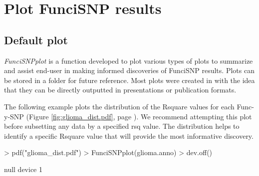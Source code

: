 \documentclass[12pt,fullpage]{article}
\newcommand{\Rmethod}[1]{{\textit{#1}}}
\begin{document}
\section{Plot FunciSNP results}
\subsection{Default plot}

\Rmethod{FunciSNPplot} is a function developed to plot various types of plots to
summarize and assist end-user in making informed discoveries of FunciSNP
results. Plots can be stored in a folder for future reference. Most plots were
created in with the idea that they can be directly outputted in presentations or
publication formats.

The following example plots the distribution of the Rsquare values for each
Func-y-SNP (Figure \ref{fig:glioma_dist.pdf}, page
        \pageref{fig:glioma_dist.pdf}). We recommend attempting this plot before
subsetting any data by a specified rsq value. The distribution helps to identify
a specific Rsquare value that will provide the most informative discovery.

\begin{Schunk}
\begin{Sinput}
> pdf("glioma_dist.pdf")
> FunciSNPplot(glioma.anno)
> dev.off()
\end{Sinput}
\begin{Soutput}
null device 
          1 
\end{Soutput}
\end{Schunk}
\end{document}
